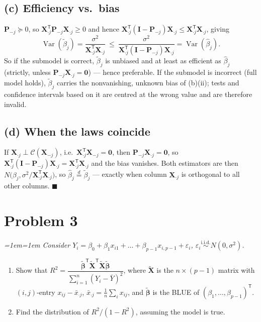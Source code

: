 \documentclass[11pt]{article}
\DeclareMathOperator{\Var}{Var}
\newcommand{\Cs}{\mathcal{C}}
\newcommand{\bX}{\mathbf{X}}
\newcommand{\bI}{\mathbf{I}}
\newcommand{\bP}{\mathbf{P}}
\newcommand{\bzero}{\mathbf{0}}
\newcommand{\Xt}{\widetilde{\bX}}
\newcommand{\bbt}{\widetilde{\bm{\beta}}}
\newcommand{\T}{^{\mathsf{T}}}
\newcommand{\bhat}[1]{\widehat{#1}}
\theoremstyle{remark}
\newenvironment{question}%
  {\smallskip\itshape\leftskip=1em\rightskip=1em\relax}%
  {\par\smallskip\noindent\hrulefill\par}
\begin{document}
\subsection*{(c) Efficiency vs.\ bias}

$\bP_{-j}\succeq0$, so $\bX_{\cdot j}\T\bP_{-j}\bX_{\cdot j}\ge0$ and hence
$\bX_{\cdot j}\T(\bI-\bP_{-j})\bX_{\cdot j}\le\bX_{\cdot j}\T\bX_{\cdot j}$, giving
\[
\Var(\widetilde\beta_j)=\frac{\sigma^2}{\bX_{\cdot j}\T\bX_{\cdot j}}\ \le\
\frac{\sigma^2}{\bX_{\cdot j}\T(\bI-\bP_{-j})\bX_{\cdot j}}=\Var(\bhat\beta_j).
\]
So if the submodel is correct, $\widetilde\beta_j$ is unbiased and at least as efficient as $\bhat\beta_j$
(strictly, unless $\bP_{-j}\bX_{\cdot j}=\bzero$) --- hence preferable. If the submodel is incorrect (full
model holds), $\widetilde\beta_j$ carries the nonvanishing, unknown bias of (b)(ii); tests and confidence
intervals based on it are centred at the wrong value and are therefore invalid.

\subsection*{(d) When the laws coincide}

If $\bX_{\cdot j}\perp\Cs(\bX_{-j})$, i.e.\ $\bX_{\cdot j}\T\bX_{-j}=\bzero$, then
$\bP_{-j}\bX_{\cdot j}=\bzero$, so $\bX_{\cdot j}\T(\bI-\bP_{-j})\bX_{\cdot j}=\bX_{\cdot j}\T\bX_{\cdot j}$
and the bias vanishes. Both estimators are then $N\!\big(\beta_j,\sigma^2/\bX_{\cdot j}\T\bX_{\cdot j}\big)$,
so $\bhat\beta_j\overset{d}{=}\widetilde\beta_j$ --- exactly when column $\bX_{\cdot j}$ is orthogonal to all
other columns. \hfill$\blacksquare$

\section*{Problem 3}

\begin{question}
Consider $Y_i=\beta_0+\beta_1x_{i1}+\dots+\beta_{p-1}x_{i,p-1}+\varepsilon_i$,
$\varepsilon_i\overset{\text{i.i.d.}}{\sim}N(0,\sigma^2)$.
\begin{enumerate}[label=(\alph*),leftmargin=2.2em,itemsep=1pt]
\item Show that $R^2=\dfrac{\bbt\T\Xt\T\Xt\bbt}{\sum_{i=1}^n(Y_i-\bar Y)^2}$, where $\Xt$ is the
$n\times(p-1)$ matrix with $(i,j)$-entry $x_{ij}-\bar x_{\cdot j}$, $\bar x_{\cdot j}=\tfrac1n\sum_i x_{ij}$,
and $\bbt$ is the BLUE of $(\beta_1,\dots,\beta_{p-1})\T$.
\item Find the distribution of $R^2/(1-R^2)$, assuming the model is true.
\end{enumerate}
\end{question}
\end{document}
